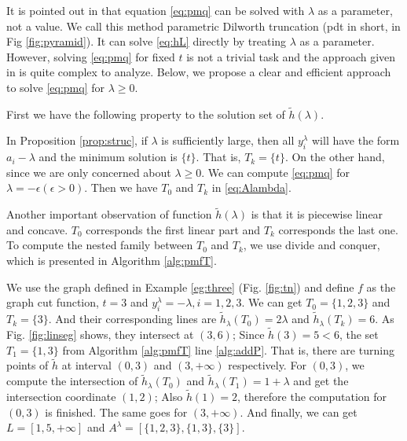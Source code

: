 \documentclass{article}
\begin{document}
It is pointed out in \cite{RN4} that equation \eqref{eq:pmq} can be solved with $\lambda$ as a parameter, not a value. We call this method parametric Dilworth truncation (\textsf{pdt} in short, in Fig \ref{fig:pyramid}). It can solve \eqref{eq:hL} directly by treating $\lambda$ as a parameter. However, solving \eqref{eq:pmq} for fixed $t$ is not a trivial task and the approach given in \cite{RN4} is quite complex to analyze. Below, we propose a clear and efficient approach to solve \eqref{eq:pmq} for $\lambda\geq 0$. 

First we have the following property to the solution set of $\tilde{h}(\lambda) $.


In Proposition \ref{prop:struc}, if $\lambda$ is sufficiently large, then all $y_i^{\lambda}$ will have the form $a_i -  \lambda$ and the minimum solution is $\{t\}$. That is, $T_k = \{t\}$. On the other hand, since we are only concerned about $\lambda \geq 0$. We can compute \eqref{eq:pmq} for $\lambda = -\epsilon (\epsilon > 0)$. Then we have $T_0$ and $T_k$ in \eqref{eq:Alambda}.

Another important observation of function $\tilde{h}(\lambda)$ is that it is piecewise linear and concave. $T_0$ corresponds the first linear part and $T_k$ corresponds the last one.  To compute the nested family between $T_0$ and $T_k$, we use divide and conquer, which is presented in Algorithm \ref{alg:pmfT}.


\begin{example}
We use the graph defined in Example \ref{eg:three} (Fig. \ref{fig:tn}) and define $f$ as the graph cut function, $t=3$ and $y^{\lambda}_i = -\lambda, i=1,2,3$. 
We can get $T_0 = \{1,2,3\} $ and $T_k = \{3\}$. And their corresponding lines are $\tilde{h}_{\lambda}(T_0) =2\lambda$ and $\tilde{h}_{\lambda}(T_k)=6$. As Fig. \ref{fig:linseg} shows, they intersect at $(3, 6)$; Since $\tilde{h}(3)=5<6$, the set $T_1=\{1,3\}$ from Algorithm \ref{alg:pmfT} line \ref{alg:addP}. That is, there are turning points of $\tilde{h}$ at interval $(0, 3)$ and $(3, +\infty)$ respectively. For $(0,3)$, we compute the intersection of $\tilde{h}_{\lambda}(T_0)$ and $\tilde{h}_{\lambda}(T_1)=1+\lambda$ and get the intersection coordinate $(1,2)$; Also $\tilde{h}(1)=2$, therefore  the computation for $(0,3)$ is finished. The same goes for $(3, +\infty)$. And finally, we can get $L=[1,5, +\infty]$ and $A^{\lambda} = [\{1,2,3\}, \{1,3\},\{3\}]$.	
\end{example}
\end{document}
